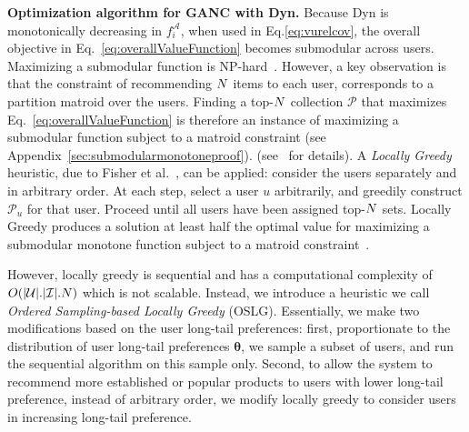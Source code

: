 \vspace{4mm}
\noindent \textbf{Optimization algorithm for GANC with Dyn. }
\label{sec:optimizingFrameworkWithDynamic}
Because Dyn is monotonically decreasing in $f_i^{\mathcal{A}}$, when used in Eq.\ref{eq:vurelcov}, the overall objective in Eq.~\ref{eq:overallValueFunction} becomes submodular across users. Maximizing a submodular function is NP-hard~\cite{khuller1999budgeted}.  %
However, a key observation is that  the constraint of recommending $N$ items to each user, corresponds to a partition matroid over the users.
 Finding  a top-$N$ collection $\mathcal{P}$ that maximizes Eq.~\ref{eq:overallValueFunction} is therefore an instance of  maximizing a submodular function subject to a matroid constraint \iffullpaper
(see Appendix~\ref{sec:submodularmonotoneproof}).
\else
(see~\cite{ourFullVersion} for details).
\fi
A \textit{Locally Greedy} heuristic, due to Fisher et al.~\cite{fisher1978analysis}, can  be applied:  consider the users separately and in arbitrary order. At each step, select a user $u$ arbitrarily, and greedily construct $\mathcal{P}_u$  for that user. Proceed until all users have been assigned top-$N$ sets. Locally Greedy produces a solution at least half the optimal value for maximizing a submodular monotone function subject to a matroid constraint~\cite{fisher1978analysis}.

\iffalse
\begin{theorem}
\label{thm:greedylocallygreedy}
The locally greedy heuristic is a $1/2$-approximation algorithm for maximizing Eq.~\ref{eq:overallValueFunction} when $v$ is submodular monotone increasing~\cite{fisher1978analysis}.
\end{theorem}
\fi

However, locally greedy is sequential and has a computational complexity of $O(\vert \mathcal{U} \vert . \vert \mathcal{I}\vert . N)$ which is not scalable.  Instead, we introduce a heuristic we call \textit{Ordered Sampling-based Locally Greedy} (OSLG).  Essentially, we make two modifications based on the user long-tail preferences:  first, proportionate to the distribution of user long-tail preferences $\bm{\theta}$, we sample a subset of users, and run the sequential algorithm on this sample only.   Second, to allow the system to recommend  more established or popular products to users with lower long-tail preference, instead of arbitrary order,  we  modify  locally greedy to consider users in increasing long-tail preference.        
\iffalse
to improve the scalability of the algorithm, we only run the sequential part  on a representative sample  of the users $\mathcal{S} \subset \mathcal{U}$, and propagate the information for users not included in the sample. 
first,  locally greedy, operates on users  sequentially and in arbitrary order.   We  modify locally greedy to consider users in increasing risk degree. 
\fi


